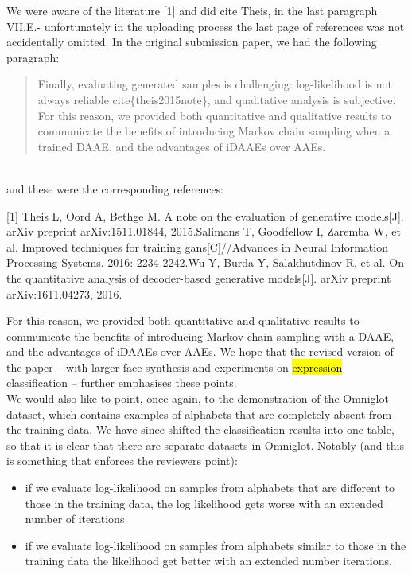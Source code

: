 \documentclass{article}
\begin{document}
We were aware of the literature [1] and did cite Theis, in the last paragraph VII.E.- unfortunately in the uploading process the last page of references was not accidentally omitted. In the original submission paper, we had the following paragraph:\\

\begin{quote} Finally, evaluating generated samples is challenging: log-likelihood is not always reliable cite\{theis2015note\}, and qualitative analysis is subjective. For this reason, we provided both quantitative and qualitative results to communicate the benefits of introducing Markov chain sampling when a trained DAAE, and the advantages of iDAAEs over AAEs. 
\end{quote}\\
and these were the corresponding references:

[1] Theis L, Oord A, Bethge M. A note on the evaluation of generative models[J]. arXiv preprint arXiv:1511.01844, 2015.\newline
[2] Salimans T, Goodfellow I, Zaremba W, et al. Improved techniques for training gans[C]//Advances in Neural Information Processing Systems. 2016: 2234-2242.\newline
[3] Wu Y, Burda Y, Salakhutdinov R, et al. On the quantitative analysis of decoder-based generative models[J]. arXiv preprint arXiv:1611.04273, 2016.\newline

For this reason, we provided both quantitative and qualitative results to communicate the benefits of introducing Markov chain sampling with a DAAE, and the advantages of iDAAEs over AAEs.  We hope that the revised version of the paper -- with larger face synthesis and experiments on \hl{expression} classification -- further emphasises these points. \\

We would also like to point, once again, to the demonstration of the Omniglot dataset, which contains examples of alphabets that are completely absent from the training data. We have since shifted the classification results into one table, so that it is clear that there are separate datasets in Omniglot. Notably (and this is something that enforces the reviewers point):

\begin{itemize}
    \item if we evaluate log-likelihood on samples from alphabets that are different to those in the training data, the log likelihood gets worse with an extended number of iterations
    \item if we evaluate log-likelihood on samples from alphabets similar to those in the training data the likelihood get better with an extended number iterations.
\end{itemize}
\end{document}
